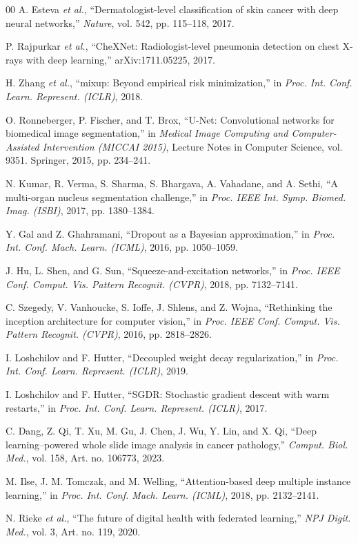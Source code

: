 \documentclass[conference]{IEEEtran}
\begin{document}
\begin{thebibliography}{00}
A. Esteva \textit{et al.}, ``Dermatologist-level classification of skin cancer with deep neural networks,'' \textit{Nature}, vol. 542, pp. 115--118, 2017.

P. Rajpurkar \textit{et al.}, ``CheXNet: Radiologist-level pneumonia detection on chest X-rays with deep learning,'' arXiv:1711.05225, 2017.

H. Zhang \textit{et al.}, ``mixup: Beyond empirical risk minimization,'' in \textit{Proc. Int. Conf. Learn. Represent. (ICLR)}, 2018.

O. Ronneberger, P. Fischer, and T. Brox, ``U-Net: Convolutional networks for biomedical image segmentation,'' in \textit{Medical Image Computing and Computer-Assisted Intervention (MICCAI 2015)}, Lecture Notes in Computer Science, vol. 9351. Springer, 2015, pp. 234--241.

N. Kumar, R. Verma, S. Sharma, S. Bhargava, A. Vahadane, and A. Sethi, ``A multi-organ nucleus segmentation challenge,'' in \textit{Proc. IEEE Int. Symp. Biomed. Imag. (ISBI)}, 2017, pp. 1380--1384.

Y. Gal and Z. Ghahramani, ``Dropout as a Bayesian approximation,'' in \textit{Proc. Int. Conf. Mach. Learn. (ICML)}, 2016, pp. 1050--1059.

J. Hu, L. Shen, and G. Sun, ``Squeeze-and-excitation networks,'' in \textit{Proc. IEEE Conf. Comput. Vis. Pattern Recognit. (CVPR)}, 2018, pp. 7132--7141.

C. Szegedy, V. Vanhoucke, S. Ioffe, J. Shlens, and Z. Wojna, ``Rethinking the inception architecture for computer vision,'' in \textit{Proc. IEEE Conf. Comput. Vis. Pattern Recognit. (CVPR)}, 2016, pp. 2818--2826.

I. Loshchilov and F. Hutter, ``Decoupled weight decay regularization,'' in \textit{Proc. Int. Conf. Learn. Represent. (ICLR)}, 2019.

I. Loshchilov and F. Hutter, ``SGDR: Stochastic gradient descent with warm restarts,'' in \textit{Proc. Int. Conf. Learn. Represent. (ICLR)}, 2017.

C. Dang, Z. Qi, T. Xu, M. Gu, J. Chen, J. Wu, Y. Lin, and X. Qi, ``Deep learning--powered whole slide image analysis in cancer pathology,'' \textit{Comput. Biol. Med.}, vol. 158, Art. no. 106773, 2023.

M. Ilse, J. M. Tomczak, and M. Welling, ``Attention-based deep multiple instance learning,'' in \textit{Proc. Int. Conf. Mach. Learn. (ICML)}, 2018, pp. 2132--2141.

N. Rieke \textit{et al.}, ``The future of digital health with federated learning,'' \textit{NPJ Digit. Med.}, vol. 3, Art. no. 119, 2020.

\end{thebibliography}
\end{document}
